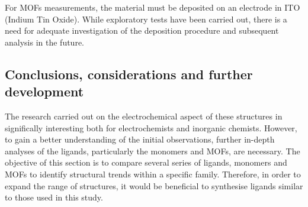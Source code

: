 \documentclass[../Master.tex]{subfiles}
\begin{document}
For MOFs measurements, the material must be deposited on an electrode in ITO (Indium Tin Oxide). While exploratory tests have been carried out, there is a need for adequate investigation of the deposition procedure and subsequent analysis in the future.

\subsection{Conclusions, considerations and further development}

The research carried out on the electrochemical aspect of these structures in significally interesting both for electrochemists and inorganic chemists. However, to gain a better understanding of the initial observations, further in-depth analyses of the ligands, particularly the monomers and MOFs, are necessary.
The objective of this section is to compare several series of ligands, monomers and MOFs to identify structural trends within a specific family. Therefore, in order to expand the range of structures, it would be beneficial to synthesise ligands similar to those used in this study.
\end{document}
